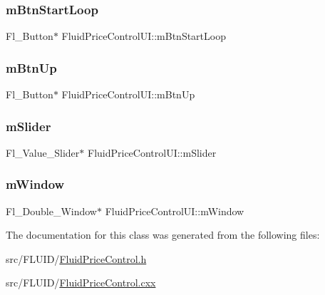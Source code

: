 \subsubsection{\texorpdfstring{m\+Btn\+Start\+Loop}{mBtnStartLoop}}
{\footnotesize\ttfamily Fl\+\_\+\+Button$\ast$ Fluid\+Price\+Control\+U\+I\+::m\+Btn\+Start\+Loop}

\mbox{\label{class_fluid_price_control_u_i_aad93e5aca9d51cb79bfcab447920725b}} 
\subsubsection{\texorpdfstring{m\+Btn\+Up}{mBtnUp}}
{\footnotesize\ttfamily Fl\+\_\+\+Button$\ast$ Fluid\+Price\+Control\+U\+I\+::m\+Btn\+Up}

\mbox{\label{class_fluid_price_control_u_i_a25682c8e7a2b560a980bf83f844f624d}} 
\subsubsection{\texorpdfstring{m\+Slider}{mSlider}}
{\footnotesize\ttfamily Fl\+\_\+\+Value\+\_\+\+Slider$\ast$ Fluid\+Price\+Control\+U\+I\+::m\+Slider}

\mbox{\label{class_fluid_price_control_u_i_ae46d2ef90d0168e432d81a4e8a3490ad}} 
\subsubsection{\texorpdfstring{m\+Window}{mWindow}}
{\footnotesize\ttfamily Fl\+\_\+\+Double\+\_\+\+Window$\ast$ Fluid\+Price\+Control\+U\+I\+::m\+Window}



The documentation for this class was generated from the following files\+:\begin{DoxyCompactItemize}
\item 
src/\+F\+L\+U\+I\+D/\hyperlink{_fluid_price_control_8h}{Fluid\+Price\+Control.\+h}\item 
src/\+F\+L\+U\+I\+D/\hyperlink{_fluid_price_control_8cxx}{Fluid\+Price\+Control.\+cxx}\end{DoxyCompactItemize}
